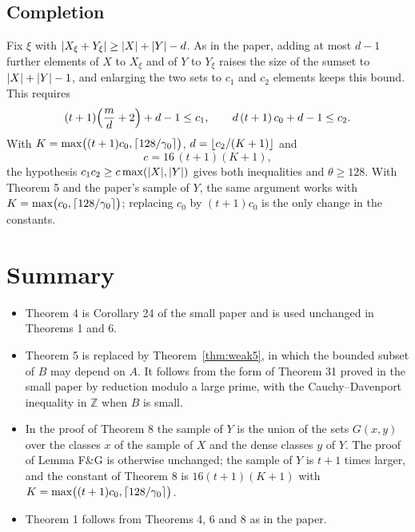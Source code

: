 \documentclass[11pt]{amsart}
\theoremstyle{remark}
\newcommand{\Z}{\mathbb{Z}}
\DeclarePairedDelimiter{\abs}{\lvert}{\rvert}
\DeclarePairedDelimiter{\floor}{\lfloor}{\rfloor}
\DeclarePairedDelimiter{\ceil}{\lceil}{\rceil}
\begin{document}
\subsection*{Completion}
Fix $\xi$ with $\abs{X_\xi + Y_\xi} \ge \abs{X} + \abs{Y} - d$. As in the paper, adding at most
$d - 1$ further elements of $X$ to $X_\xi$ and of $Y$ to $Y_\xi$ raises the size of the sumset to
$\abs{X} + \abs{Y} - 1$, and enlarging the two sets to $c_1$ and $c_2$ elements keeps this bound.
This requires
\[
  (t + 1)\Bigl(\frac{m}{d} + 2\Bigr) + d - 1 \le c_1 ,
  \qquad
  d\,(t + 1)\,c_0 + d - 1 \le c_2 .
\]
With $K = \max\bigl((t + 1)c_0, \ceil{128/\gamma_0}\bigr)$, $d = \floor{c_2/(K + 1)}$ and
\[
  c = 16\,(t + 1)(K + 1),
\]
the hypothesis $c_1 c_2 \ge c \max(\abs{X}, \abs{Y})$ gives both inequalities and
$\theta \ge 128$. With Theorem 5 and the paper's sample of $Y$, the same argument works with
$K = \max\bigl(c_0, \ceil{128/\gamma_0}\bigr)$; replacing $c_0$ by $(t + 1)c_0$ is the only
change in the constants.

\section{Summary}

\begin{itemize}
\item Theorem 4 is Corollary 24 of the small paper and is used unchanged in Theorems 1 and 6.
\item Theorem 5 is replaced by Theorem~\ref{thm:weak5}, in which the bounded subset of $B$ may
  depend on $A$. It follows from the form of Theorem 31 proved in the small paper by reduction
  modulo a large prime, with the Cauchy--Davenport inequality in $\Z$ when $B$ is small.
\item In the proof of Theorem 8 the sample of $Y$ is the union of the sets $G(x, y)$ over the
  classes $x$ of the sample of $X$ and the dense classes $y$ of $Y$. The proof of Lemma F\&G is
  otherwise unchanged; the sample of $Y$ is $t + 1$ times larger, and the constant of Theorem 8
  is $16(t + 1)(K + 1)$ with $K = \max\bigl((t + 1)c_0, \ceil{128/\gamma_0}\bigr)$.
\item Theorem 1 follows from Theorems 4, 6 and 8 as in the paper.
\end{itemize}
\end{document}
